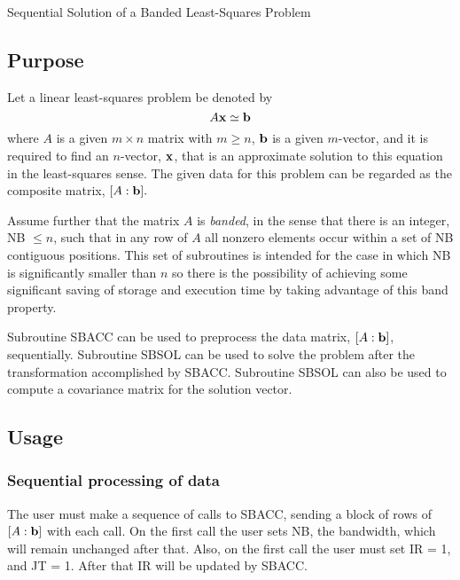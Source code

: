 \documentclass[twoside]{MATH77}
\begin{document}
 Sequential Solution of a Banded Least-Squares Problem


\subsection{Purpose}

Let a linear least-squares problem be denoted by
\begin{equation*}
A{\bf x}\simeq {\bf b}
\end{equation*}
where $A$ is a given $m\times n$ matrix with $m\geq n$, ${\bf b}$ is a given
$m$-vector, and it is required to find an $n$-vector, ${\bf x}$, that is an
approximate solution to this equation in the least-squares sense. The given
data for this problem can be regarded as the composite matrix, $[A:{\bf b}].$

Assume further that the matrix $A$ is {\em banded}, in the sense that there
is an integer, NB $\leq n$, such that in any row of $A$ all nonzero elements
occur within a set of NB contiguous positions. This set of subroutines is
intended for the case in which NB is significantly smaller than $n$ so there
is the possibility of achieving some significant saving of storage and
execution time by taking advantage of this band property.

Subroutine SBACC can be used to preprocess the data matrix, $[A:{\bf b}]$,
sequentially. Subroutine SBSOL can be used to solve the problem after the
transformation accomplished by SBACC. Subroutine SBSOL can also be used to
compute a covariance matrix for the solution vector.

\subsection{Usage}

\subsubsection{Sequential processing of data}

The user must make a sequence of calls to SBACC, sending a block of rows of $%
[A:{\bf b}]$ with each call. On the first call the user sets NB, the
bandwidth, which will remain unchanged after that. Also, on the first call
the user must set IR = 1, and JT = 1. After that IR will be updated by SBACC.
\end{document}

